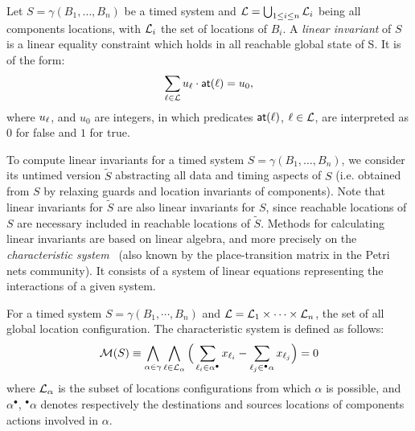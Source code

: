 \begin{definition}
\label{def:inv}
Let $S = \gamma(B_1,\dotsc,B_n)$ be a timed system and $\mathcal{L} = \bigcup_{1 \leq i \leq n} \mathcal{L}_i$
being all components locations, with $\mathcal{L}_i$ the set of locations of $B_i$.
A \emph{linear invariant} of $S$ is a linear equality constraint 
which holds in all reachable global state of S. It is of the form:
$$ \sum_{\ell \in\mathcal{L}}u_{\ell}\cdot \textsf{at}(\ell) = u_0, $$
where $u_{\ell}$, and $u_0$ are integers, in which predicates $\textsf{at}(\ell)$,
$\ell \in \mathcal{L}$, are interpreted as $0$ for false and $1$ for true.
\end{definition}

To compute linear invariants for a timed system $S = \gamma(B_1,\dotsc,B_n)$, we consider its 
untimed version $\tilde{S}$ abstracting all data and timing aspects of $S$
(i.e. obtained from $S$ by relaxing guards and location invariants of components).
Note that linear invariants for $\tilde{S}$ are also linear invariants for $S$, since 
reachable locations of $S$ are necessary included in reachable locations of $\tilde{S}$.
Methods for calculating linear invariants are based on linear algebra, and more precisely
on the \emph{characteristic system}~\cite{inv1} (also known by the place-transition matrix in 
the Petri nets community). It consists of a system of linear equations representing 
the interactions of a given system.
\begin{definition}\label{def:chars}
  For a timed system $S=\gamma(B_1,\cdots,B_n)$ and $\mathcal{L}=\mathcal{L}_1\times\cdots\times\mathcal{L}_n$,
  the set of all global location configuration. The characteristic system is defined as 
  follows:
  $$\mathcal{M}(S)\equiv\bigwedge_{\alpha\in\gamma}\bigwedge_{\ell\in\mathcal{L}_{\alpha}}
\Big(\sum_{\ell_i\in\alpha^{\bullet}}x_{\ell_i}-\sum_{\ell_j\in{^\bullet}\alpha}x_{\ell_j}
  \Big)=0$$
  where $\mathcal{L}_{\alpha}$ is the subset of locations configurations from which $\alpha$ is 
  possible, and $\alpha^{\bullet}$, ${^\bullet}\alpha$ denotes respectively the destinations and 
  sources locations of components actions involved in $\alpha$.
\end{definition}

